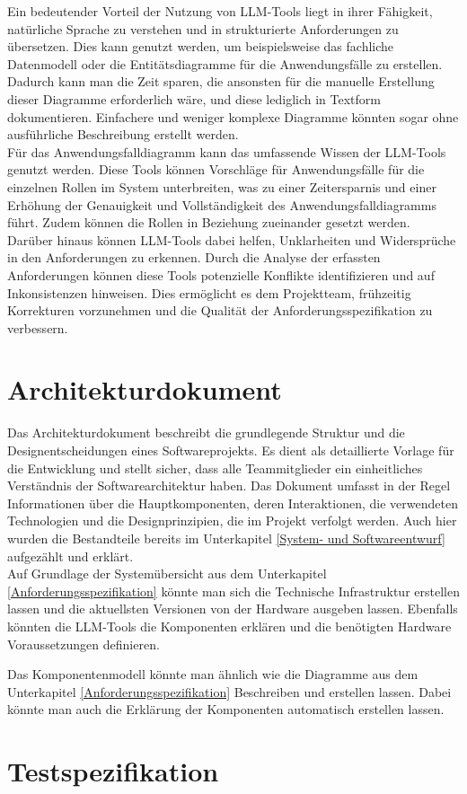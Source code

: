 Ein bedeutender Vorteil der Nutzung von LLM-Tools liegt in ihrer Fähigkeit, natürliche Sprache zu verstehen und in 
strukturierte Anforderungen zu übersetzen. Dies kann genutzt werden, um beispielsweise das fachliche Datenmodell 
oder die Entitätsdiagramme für die Anwendungsfälle zu erstellen. Dadurch kann man die Zeit sparen, die ansonsten 
für die manuelle Erstellung dieser Diagramme erforderlich wäre, und diese lediglich in Textform dokumentieren. 
Einfachere und weniger komplexe Diagramme könnten sogar ohne ausführliche Beschreibung erstellt werden.\\

Für das Anwendungsfalldiagramm kann das umfassende Wissen der LLM-Tools genutzt werden. Diese Tools können Vorschläge 
für Anwendungsfälle für die einzelnen Rollen im System unterbreiten, was zu einer Zeitersparnis und einer Erhöhung 
der Genauigkeit und Vollständigkeit des Anwendungsfalldiagramms führt. Zudem können die Rollen in Beziehung 
zueinander gesetzt werden.\\

Darüber hinaus können LLM-Tools dabei helfen, Unklarheiten und Widersprüche in den Anforderungen zu erkennen. 
Durch die Analyse der erfassten Anforderungen können diese Tools potenzielle Konflikte identifizieren und auf 
Inkonsistenzen hinweisen. Dies ermöglicht es dem Projektteam, frühzeitig Korrekturen vorzunehmen und die Qualität 
der Anforderungsspezifikation zu verbessern.

\section{Architekturdokument}  \label{Architekturdokument}

Das Architekturdokument beschreibt die grundlegende Struktur und die Designentscheidungen eines Softwareprojekts. Es 
dient als detaillierte Vorlage für die Entwicklung und stellt sicher, dass alle Teammitglieder ein einheitliches 
Verständnis der Softwarearchitektur haben. Das Dokument umfasst in der Regel Informationen über die Hauptkomponenten, 
deren Interaktionen, die verwendeten Technologien und die Designprinzipien, die im Projekt verfolgt werden. Auch hier 
wurden die Bestandteile bereits im Unterkapitel \ref{System- und Softwareentwurf} aufgezählt und erklärt.\\

Auf Grundlage der Systemübersicht aus dem Unterkapitel \ref{Anforderungsspezifikation} könnte man sich die Technische Infrastruktur
erstellen lassen und die aktuellsten Versionen von der Hardware ausgeben lassen. Ebenfalls könnten die LLM-Tools die
Komponenten erklären und die benötigten Hardware Voraussetzungen definieren.

Das Komponentenmodell könnte man ähnlich wie die Diagramme aus dem Unterkapitel \ref{Anforderungsspezifikation} Beschreiben
und erstellen lassen. Dabei könnte man auch die Erklärung der Komponenten automatisch erstellen lassen.

\section{Testspezifikation}  \label{Testspezifikation}